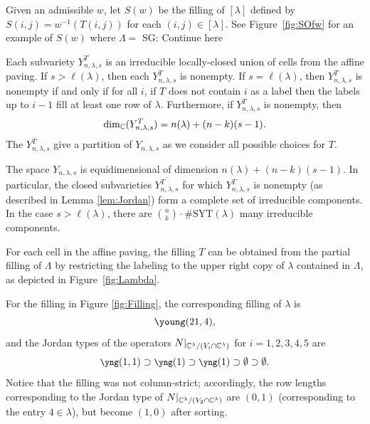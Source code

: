 \documentclass[12pt]{amsart}
\newcommand{\la}{\lambda}
\newcommand{\SYT}{\mathrm{SYT}}
\newcommand{\SG}[1]{{\color{red} SG: #1}}
\begin{document}
Given an admissible $w$, let $S(w)$ be the filling of $[\la]$ defined by $S(i,j) = w^{-1}(T(i,j))$ for each $(i,j)\in [\la]$. See Figure~\ref{fig:SOfw} for an example of $S(w)$ where $\Lambda = $\SG{Continue here}

\begin{lemma}
\label{lem:Jordan}
Each subvariety $Y_{n,\la,s}^{T}$ is an irreducible locally-closed union of cells from the affine paving.
If $s>\ell(\la)$, then each $Y_{n,\la,s}^{T}$ is nonempty. If $s = \ell(\la)$, then $Y_{n,\la,s}^{T}$ is nonempty if and only if for all $i$, if $T$ does not contain $i$ as a label then the labels up to $i-1$ fill at least one row of $\lambda$. Furthermore, if $Y_{n,\la,s}^{T}$ is nonempty, then
\begin{align}\label{eq:DimFormulaForCmpt}
\dim_\bC(Y_{n,\la,s}^{T}) = n(\la) + (n-k)(s-1).
\end{align}
The $Y_{n,\la,s}^{T}$ give a partition of $Y_{n,\la,s}$ as we consider all possible choices for $T$.
\end{lemma}

\begin{theorem}
The space $Y_{n,\la,s}$ is equidimensional of dimension $n(\la) + (n-k)(s-1)$.  In particular, the closed subvarieties $\overline{Y_{n,\la,s}^{T}}$ for which $Y_{n,\la,s}^{T}$ is nonempty (as described in Lemma \ref{lem:Jordan}) form a complete set of irreducible components. In the case $s>\ell(\la)$, there are $\binom{n}{k}\cdot \#\SYT(\la)$ many irreducible components.
\end{theorem}

For each cell in the affine paving, the filling $T$ can be obtained from the partial filling of $\Lambda$ by restricting the labeling to the upper right copy of $\lambda$ contained in $\Lambda$, as depicted in Figure~\ref{fig:Lambda}.

\begin{example}
For the filling in Figure \ref{fig:Filling}, the corresponding filling of $\lambda$ is
\[\young(21,4),\]
and the Jordan types of the operators $N|_{\mathbb{C}^\lambda/(V_i\cap \mathbb{C}^\lambda)}$ for $i=1,2,3,4,5$ are
\[
{\small \yng(1,1)}\supset {\small \yng(1)}\supset {\small \yng(1)}\supset \emptyset \supset \emptyset.
\]
Notice that the filling was not column-strict; accordingly, the row lengths corresponding to the Jordan type of $N|_{\mathbb{C}^\lambda/(V_2\cap \mathbb{C}^\lambda)}$ are $(0, 1)$ (corresponding to the entry $4 \in \lambda$), but become $(1, 0)$ after sorting.
\end{example}
\end{document}
